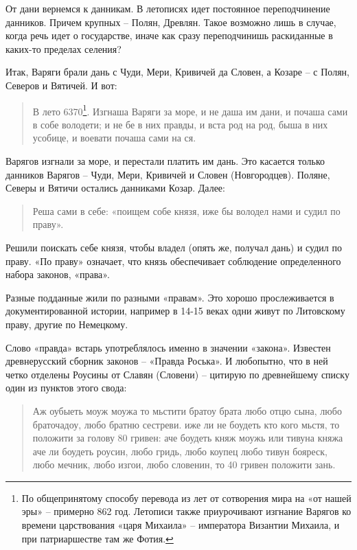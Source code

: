 От дани вернемся к данникам. В летописях идет постоянное переподчинение данников. Причем крупных – Полян, Древлян. Такое возможно лишь в случае, когда речь идет о государстве, иначе как сразу переподчинишь раскиданные в каких-то пределах селения?

Итак, Варяги брали дань с Чуди, Мери, Кривичей да Словен, а Козаре – с Полян, Северов и Вятичей. И вот: 

\begin{quotation}
В лето 6370\footnote{По общепринятому способу перевода из лет от сотворения мира на «от нашей эры» – примерно 862 год. Летописи также приурочивают изгнание Варягов ко времени царствования «царя Михаила» – императора Византии Михаила, и при патриаршестве там же Фотия.}. Изгнаша Варяги за море, и не даша им дани, и почаша сами в собе володети; и не бе в них правды, и вста род на род, быша в них усобице, и воевати почаша сами на ся.
\end{quotation}

Варягов изгнали за море, и перестали платить им дань. Это касается только данников Варягов – Чуди, Мери, Кривичей и Словен (Новгородцев). Поляне, Северы и Вятичи остались данниками Козар. Далее:

\begin{quotation}
Реша сами в себе: «поищем собе князя, иже бы володел нами и судил по праву».
\end{quotation}

Решили поискать себе князя, чтобы владел (опять же, получал дань) и судил по праву. «По праву» означает, что князь обеспечивает соблюдение определенного набора законов, «права».

Разные подданные жили по разными «правам». Это хорошо прослеживается в документированной истории, например в 14-15 веках одни живут по Литовскому праву, другие по Немецкому. 

Слово «правда» встарь употреблялось именно в значении «закона». Известен древнерусский сборник законов – «Правда Роська». И любопытно, что в ней четко отделены Роусины от Славян (Словени) – цитирую по древнейшему списку один из пунктов этого свода:

\begin{quotation}
Аж оубыеть моуж моужа то мьстити братоу брата любо отцю сына, любо браточадоу, любо братню сестреви. иже ли не боудеть кто кого мьстя, то положити за голову 80 гривен: аче боудеть княж моужь или тивуна княжа аче ли боудеть роусин, любо гридь, любо коупец любо тивун бояреск, любо мечник, любо изгои, любо словенин, то 40 гривен положити зань.
\end{quotation}

